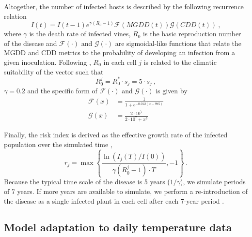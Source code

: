 Altogether, the number of infected hosts is described by the following
recurrence relation
\begin{equation}
    I(t)=I(t-1)e^{\gamma(R_0-1)}\mathcal{F}(MGDD(t))\mathcal{G}(CDD(t)) \ ,
\end{equation}
where $\gamma$ is the death rate of infected vines, $R_0$ is the basic
reproduction number of the disease and $\mathcal{F}(\cdot)$ and
$\mathcal{G}(\cdot)$ are sigmoidal-like functions that relate the MGDD and CDD
metrics to the probability of developing an infection from a given inoculation.
Following \cite{GimenezRomero2022_CommsBio}, $R_0$ in each cell $j$ is related
to the
climatic suitability of the vector such that
\begin{equation}
    R_0^j=R_0^*\cdot s_j=5\cdot s_j \ ,
\end{equation}
$\gamma=0.2$ and the specific form of $\mathcal{F}(\cdot)$ and
$\mathcal{G}(\cdot)$ is given by
\begin{align}
    \mathcal{F}(x) & = \frac{1}{1+e^{-0.012(x-975)}}        \\
    \mathcal{G}(x) & = \frac{2\cdot10^7}{2\cdot 10^7 + x^3}
\end{align}

Finally, the risk index is derived as the effective growth rate of the
infected population over the simulated time \cite{GimenezRomero2022_CommsBio},
\begin{equation}
    r_j=\max\left\{\frac{\ln(I_j(T) / I(0))}{\gamma(R_0^j-1)\cdot T},
    -1\right\} \ .
\end{equation}
Because the typical time scale of the disease is 5 years ($1/\gamma$), we
simulate periods of 7 years. If more years are available to simulate, we
perform a re-introduction of the disease as a single infected plant in each
cell after each 7-year period
\cite{GimenezRomero2022_CommsBio}.

\subsection{Model adaptation to daily temperature data}

